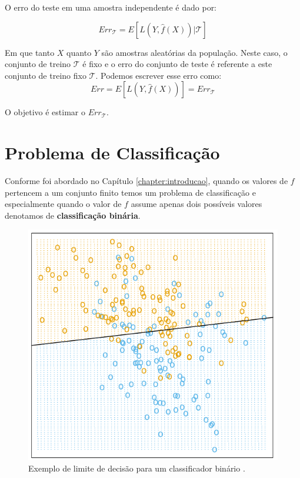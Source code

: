 O erro do teste em uma amostra independente é dado por:

\begin{equation}
    Err_{\mathcal{T}} = E[L(Y,\hat{f}(X))|\mathcal{T}]
\end{equation}

Em que tanto $X$ quanto $Y$ são amostras aleatórias da população. Neste caso, o conjunto de treino $\mathcal{T}$ é fixo e o erro do conjunto de teste é referente a este conjunto de treino fixo $\mathcal{T}$. Podemos escrever esse erro como:
\begin{equation}
    Err = E[L(Y,\hat{f}(X))] = Err_{\mathcal{T}}
\end{equation}

O objetivo é estimar o $Err_{\mathcal{T}}$.

\section{Problema de Classificação}
Conforme foi abordado no Capítulo \ref{chapter:introducao}, quando os valores de $f$ pertencem a um conjunto finito temos um problema de classificação e especialmente quando o valor de $f$ assume apenas dois possíveis valores denotamos de \textbf{classificação binária}.
\begin{figure}[htb]
 \caption{Exemplo de limite de decisão para um classificador binário \cite{hastie}.}
 \label{fig:clas_ex}
 \centering
 \includegraphics[scale=0.4]{images/classificacao_hastie_ex.png}
\end{figure}

